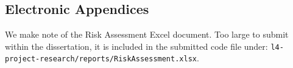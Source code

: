 \begin{appendices}


\section{Electronic Appendices}
\label{appendix:electronic_appendices}

We make note of the Risk Assessment Excel document. Too large to submit within the dissertation, it is included in the submitted code file under: \texttt{l4-project-research/reports/RiskAssessment.xlsx}.

\end{appendices}
